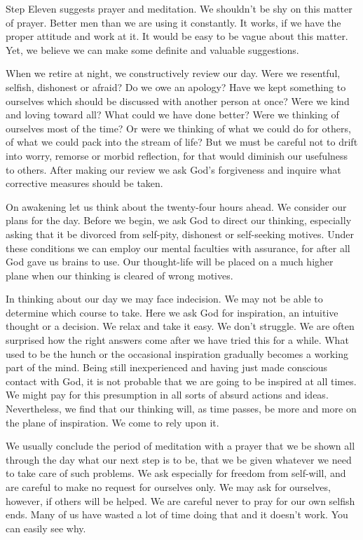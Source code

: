 \begin{biblechapter}
Step Eleven suggests prayer and meditation.  We shouldn't be shy on this matter of prayer.  Better men than we are using it constantly.  It works, if we have the proper attitude and work at it.  It would be easy to be vague about this matter.  Yet, we believe we can make some definite and valuable suggestions.

When we retire at night, we constructively review our day.  Were we resentful, selfish, dishonest or afraid?  Do we owe an apology?  Have we kept something to ourselves which should be discussed with another person at once?  Were we kind and loving toward all?  What could we have done better?  Were we thinking of ourselves most of the time?  Or were we thinking of what we could do for others, of what we could pack into the stream of life?  But we must be careful not to drift into worry, remorse or morbid reflection, for that would diminish our usefulness to others.  After making our review we ask God's forgiveness and inquire what corrective measures should be taken.

On awakening let us think about the twenty-four hours ahead.  We consider our plans for the day.  Before we begin, we ask God to direct our thinking, especially asking that it be divorced from self-pity, dishonest or self-seeking motives.  Under these conditions we can employ our mental faculties with assurance, for after all God gave us brains to use.  Our thought-life will be placed on a much higher plane when our thinking is cleared of wrong motives. 

In thinking about our day we may face indecision.  We may not be able to determine which course to take.  Here we ask God for inspiration, an intuitive thought or a decision.  We relax and take it easy.  We don't struggle.  We are often surprised how the right answers come after we have tried this for a while.  What used to be the hunch or the occasional inspiration gradually becomes a working part of the mind.  Being still inexperienced and having just made conscious contact with God, it is not probable that we are going to be inspired at all times.  We might pay for this presumption in all sorts of absurd actions and ideas.  Nevertheless, we find that our thinking will, as time passes, be more and more on the plane of inspiration.  We come to rely upon it.

We usually conclude the period of meditation with a prayer that we be shown all through the day what our next step is to be, that we be given whatever we need to take care of such problems.  We ask especially for freedom from self-will, and are careful to make no request for ourselves only.  We may ask for ourselves, however, if others will be helped.  We are careful never to pray for our own selfish ends.  Many of us have wasted a lot of time doing that and it doesn't work.  You can easily see why.


\end{biblechapter}
